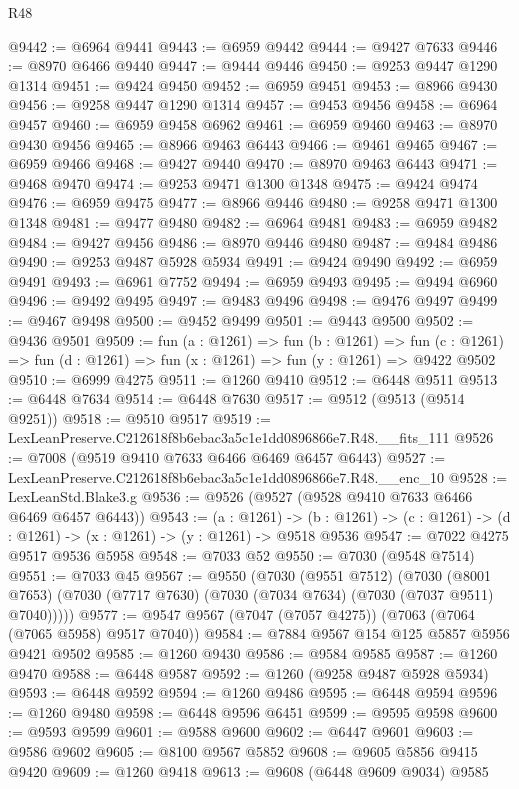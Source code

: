 \begin{lexlean}{R48}
\begin{coremodule}
@9442 := @6964 @9441
@9443 := @6959 @9442
@9444 := @9427 @7633
@9446 := @8970 @6466 @9440
@9447 := @9444 @9446
@9450 := @9253 @9447 @1290 @1314
@9451 := @9424 @9450
@9452 := @6959 @9451
@9453 := @8966 @9430
@9456 := @9258 @9447 @1290 @1314
@9457 := @9453 @9456
@9458 := @6964 @9457
@9460 := @6959 @9458 @6962
@9461 := @6959 @9460
@9463 := @8970 @9430 @9456
@9465 := @8966 @9463 @6443
@9466 := @9461 @9465
@9467 := @6959 @9466
@9468 := @9427 @9440
@9470 := @8970 @9463 @6443
@9471 := @9468 @9470
@9474 := @9253 @9471 @1300 @1348
@9475 := @9424 @9474
@9476 := @6959 @9475
@9477 := @8966 @9446
@9480 := @9258 @9471 @1300 @1348
@9481 := @9477 @9480
@9482 := @6964 @9481
@9483 := @6959 @9482
@9484 := @9427 @9456
@9486 := @8970 @9446 @9480
@9487 := @9484 @9486
@9490 := @9253 @9487 @5928 @5934
@9491 := @9424 @9490
@9492 := @6959 @9491
@9493 := @6961 @7752
@9494 := @6959 @9493
@9495 := @9494 @6960
@9496 := @9492 @9495
@9497 := @9483 @9496
@9498 := @9476 @9497
@9499 := @9467 @9498
@9500 := @9452 @9499
@9501 := @9443 @9500
@9502 := @9436 @9501
@9509 := fun (a : @1261) =>
  fun (b : @1261) =>
  fun (c : @1261) => fun (d : @1261) => fun (x : @1261) => fun (y : @1261) => @9422 @9502
@9510 := @6999 @4275
@9511 := @1260 @9410
@9512 := @6448 @9511
@9513 := @6448 @7634
@9514 := @6448 @7630
@9517 := @9512 (@9513 (@9514 @9251))
@9518 := @9510 @9517
@9519 := LexLeanPreserve.C212618f8b6ebac3a5c1e1dd0896866e7.R48.__fits_111
@9526 := @7008 (@9519 @9410 @7633 @6466 @6469 @6457 @6443)
@9527 := LexLeanPreserve.C212618f8b6ebac3a5c1e1dd0896866e7.R48.__enc_10
@9528 := LexLeanStd.Blake3.g
@9536 := @9526 (@9527 (@9528 @9410 @7633 @6466 @6469 @6457 @6443))
@9543 := (a : @1261) ->
  (b : @1261) -> (c : @1261) -> (d : @1261) -> (x : @1261) -> (y : @1261) -> @9518 @9536
@9547 := @7022 @4275 @9517 @9536 @5958
@9548 := @7033 @52
@9550 := @7030 (@9548 @7514)
@9551 := @7033 @45
@9567 := @9550
    (@7030
      (@9551 @7512)
      (@7030 (@8001 @7653) (@7030 (@7717 @7630) (@7030 (@7034 @7634) (@7030 (@7037 @9511) @7040)))))
@9577 := @9547 @9567 (@7047 (@7057 @4275)) (@7063 (@7064 (@7065 @5958) @9517 @7040))
@9584 := @7884 @9567 @154 @125 @5857 @5956 @9421 @9502
@9585 := @1260 @9430
@9586 := @9584 @9585
@9587 := @1260 @9470
@9588 := @6448 @9587
@9592 := @1260 (@9258 @9487 @5928 @5934)
@9593 := @6448 @9592
@9594 := @1260 @9486
@9595 := @6448 @9594
@9596 := @1260 @9480
@9598 := @6448 @9596 @6451
@9599 := @9595 @9598
@9600 := @9593 @9599
@9601 := @9588 @9600
@9602 := @6447 @9601
@9603 := @9586 @9602
@9605 := @8100 @9567 @5852
@9608 := @9605 @5856 @9415 @9420
@9609 := @1260 @9418
@9613 := @9608 (@6448 @9609 @9034) @9585

\end{coremodule}
\end{lexlean}
